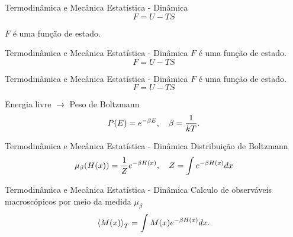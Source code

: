 \documentclass[10pt]{beamer}
\begin{document}
\begin{frame}{Termodinâmica e Mecânica Estatística - Dinâmica}
	\begin{equation*}
		F = U - TS
	\end{equation*}
	
	$F$ é uma função de estado. 	
	
\end{frame}

\begin{frame}{Termodinâmica e Mecânica Estatística - Dinâmica}
	$F$ é uma função de estado.  \\
	\begin{equation*}
		F = U - TS
	\end{equation*}
	

	
\end{frame}

\begin{frame}{Termodinâmica e Mecânica Estatística - Dinâmica}
	$F$ é uma função de estado.  \\
	\begin{equation*}
		F = U - TS
	\end{equation*}
	
	Energia livre $\to$ Peso de Boltzmann
	\begin{equation*}
		P(E) = e^{-\beta E} \qc \beta = \frac{1}{kT}.
	\end{equation*}
	
\end{frame}


\begin{frame}{Termodinâmica e Mecânica Estatística - Dinâmica}
	Distribuição de Boltzmann\\
	\begin{equation*}
		\mu_\beta (H(x)) = \frac{1}{Z} e^{-\beta H(x)} \qc Z = \int e^{-\beta H(x)} dx
	\end{equation*}
	
\end{frame}

\begin{frame}{Termodinâmica e Mecânica Estatística - Dinâmica}
	Calculo de observáveis macroscópicos por meio da medida $\mu_\beta$
	\begin{equation*}
		\ev{M(x)}_T = \int  M(x) e^{-\beta H(x)} dx.
	\end{equation*}

	
\end{frame}
\end{document}
